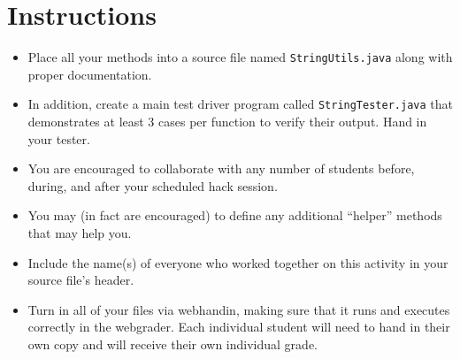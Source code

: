 \documentclass[12pt]{scrartcl}
\begin{document}
\section*{Instructions}

\begin{itemize}

  \item Place all your methods into a source file 
  named \texttt{StringUtils.java} along with proper documentation.
  
  \item In addition, create a main test driver program called
  \texttt{StringTester.java} that demonstrates at least 3 cases 
  per function to verify their output.  Hand in your tester.
  
  \item You are encouraged to collaborate with any number of students 
  before, during, and after your scheduled hack session.  

  \item You may (in fact are encouraged) to define any additional
  ``helper'' methods that may help you.
  
  \item Include the name(s) of everyone who worked together on
  this activity in your source file's header.

  \item Turn in all of your files via webhandin, making sure that 
  it runs and executes correctly in the webgrader.  Each individual 
  student will need to hand in their own copy and will receive 
  their own individual grade.

\end{itemize}  
\end{document}
